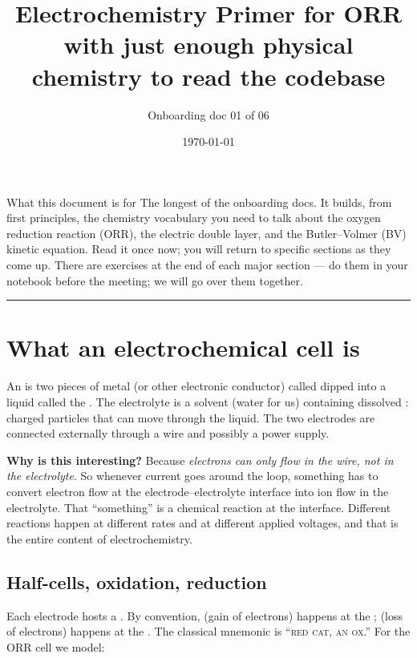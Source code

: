 \documentclass[11pt]{article}
\title{\bfseries Electrochemistry Primer for ORR \\
       \large with just enough physical chemistry to read the codebase}
\author{Onboarding doc 01 of 06}
\date{\today}
\begin{document}
\maketitle

\begin{callout}{What this document is for}
The longest of the onboarding docs. It builds, from first
principles, the chemistry vocabulary you need to talk about the
oxygen reduction reaction (ORR), the electric double layer, and the
Butler--Volmer (BV) kinetic equation. Read it once now; you will
return to specific sections as they come up. There are exercises at
the end of each major section --- do them in your notebook before the
meeting; we will go over them together.
\end{callout}

\tableofcontents
\bigskip\hrule\bigskip

\section{What an electrochemical cell is}

An  is two pieces of metal (or other
electronic conductor) called  dipped into a
liquid called the . The electrolyte is a
solvent (water for us) containing dissolved : charged
particles that can move through the liquid. The two electrodes are
connected externally through a wire and possibly a power supply.

\textbf{Why is this interesting?} Because \emph{electrons can only
flow in the wire, not in the electrolyte}. So whenever current goes
around the loop, something has to convert electron flow at the
electrode--electrolyte interface into ion flow in the electrolyte.
That ``something'' is a chemical reaction at the interface. Different
reactions happen at different rates and at different applied
voltages, and that is the entire content of electrochemistry.

\subsection{Half-cells, oxidation, reduction}

Each electrode hosts a . By convention,
 (gain of electrons) happens at the
;  (loss of electrons) happens
at the . The classical mnemonic is
``\textsc{red cat}, \textsc{an ox}.'' For the ORR cell we model:
\end{document}
